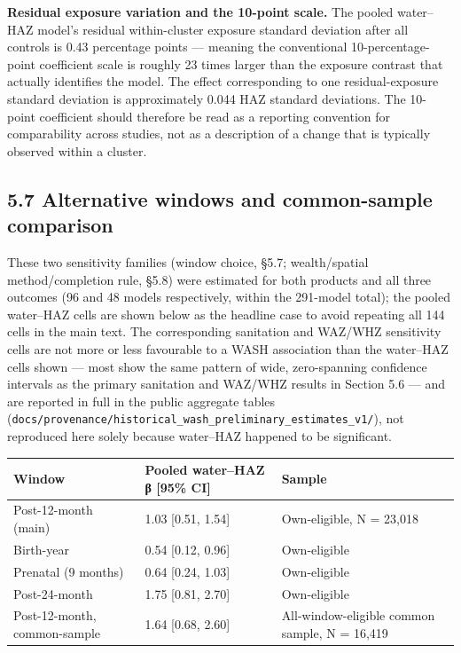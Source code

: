 \textbf{Residual exposure variation and the 10-point scale.} The pooled water--HAZ model's residual within-cluster exposure standard deviation after all controls is 0.43 percentage points --- meaning the conventional 10-percentage-point coefficient scale is roughly 23 times larger than the exposure contrast that actually identifies the model. The effect corresponding to one residual-exposure standard deviation is approximately 0.044 HAZ standard deviations. The 10-point coefficient should therefore be read as a reporting convention for comparability across studies, not as a description of a change that is typically observed within a cluster.

\subsection*{5.7 Alternative windows and common-sample comparison}

These two sensitivity families (window choice, §5.7; wealth/spatial method/completion rule, §5.8) were estimated for both products and all three outcomes (96 and 48 models respectively, within the 291-model total); the pooled water--HAZ cells are shown below as the headline case to avoid repeating all 144 cells in the main text. The corresponding sanitation and WAZ/WHZ sensitivity cells are not more or less favourable to a WASH association than the water--HAZ cells shown --- most show the same pattern of wide, zero-spanning confidence intervals as the primary sanitation and WAZ/WHZ results in Section 5.6 --- and are reported in full in the public aggregate tables (\texttt{docs/provenance/historical\_wash\_preliminary\_estimates\_v1/}), not reproduced here solely because water--HAZ happened to be significant.

\begingroup\fontsize{10}{15}\selectfont
\begin{longtable}{lll}
\toprule
Window & Pooled water--HAZ β [95\% CI] & Sample \\
\midrule
\endhead
Post-12-month (main) & 1.03 [0.51, 1.54] & Own-eligible, N = 23,018 \\
Birth-year & 0.54 [0.12, 0.96] & Own-eligible \\
Prenatal (9 months) & 0.64 [0.24, 1.03] & Own-eligible \\
Post-24-month & 1.75 [0.81, 2.70] & Own-eligible \\
Post-12-month, common-sample & 1.64 [0.68, 2.60] & All-window-eligible common sample, N = 16,419 \\
\bottomrule
\end{longtable}
\endgroup

